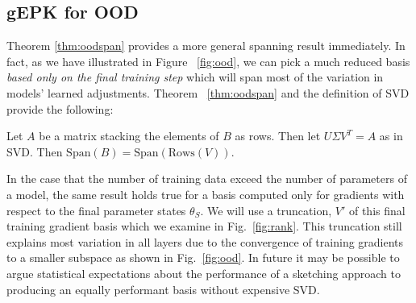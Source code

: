 \subsection{gEPK for OOD}
Theorem \ref{thm:oodspan} provides a more general spanning result immediately. In fact, as we have illustrated in Figure ~\ref{fig:ood}, we can pick a much reduced basis \emph{based only on the final training step} which will span most of the variation in models' learned adjustments.
Theorem ~\ref{thm:oodspan} and the definition of SVD provide the following:
\begin{corollary}
    Let $A$ be a matrix stacking the elements of $B$ as rows. Then let $U \Sigma V^T = A$ as in SVD. Then $\text{Span}(B) = \text{Span}(\text{Rows}(V))$. 
\end{corollary} 
In the case that  the number of training data exceed the number of parameters of a model, the same result holds true for a basis computed only for gradients with respect to the final parameter states $\theta_S$. We will use a truncation, $V'$ of this final training gradient basis which we examine in Fig.~\ref{fig:rank}. This truncation still explains most variation in all layers due to the convergence of training gradients to a smaller subspace as shown in Fig.~\ref{fig:ood}. In future it may be possible to argue statistical expectations about the performance of a sketching approach to producing an equally performant basis without expensive SVD. 




